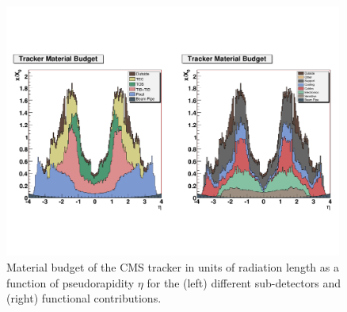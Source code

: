 \begin{figure}
 \centering
\includegraphics[width=0.99\textwidth]{CMS_DetectorFigures/TrackerMaterialBudget.pdf}
 \caption{Material budget of the CMS tracker in units of radiation
   length as a function of pseudorapidity $\eta$ for the (left)
   different sub-detectors and (right) functional contributions.\label{fig:materialBudget}}
\end{figure}
